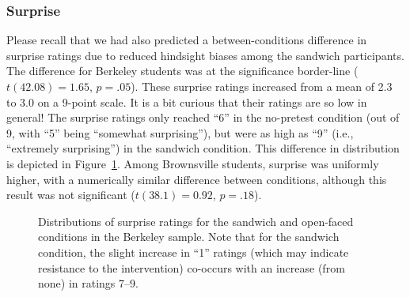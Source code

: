 \subsubsection{Surprise}

Please recall that we had also predicted a between-conditions difference in
surprise ratings due to reduced hindsight biases among the sandwich
participants. The difference for Berkeley students was at the significance
border-line ($t(42.08) = 1.65$, $p = .05$). These surprise ratings increased
from a mean of 2.3 to 3.0 on a 9-point scale. It is a bit curious that
their ratings are so low in general! The surprise ratings only reached “6” in
the no-pretest condition (out of 9, with “5” being “somewhat surprising”), but
were as high as “9” (i.e., “extremely surprising”) in the sandwich condition.
This difference in distribution is depicted in
Figure~\ref{fig:uc-mech-surprise}.  Among Brownsville students, surprise was
uniformly higher, with a numerically similar difference between conditions,
although this result was not significant ($t(38.1) = 0.92$, $p = .18$). 

\begin{figure}[h]
    \centering
    \caption{Distributions of surprise ratings for the sandwich and open-faced
        conditions in the Berkeley sample. Note that for the sandwich condition,
        the slight increase in ``1'' ratings (which may indicate resistance to
        the intervention) co-occurs with an increase (from none) in ratings 7--9.}
    \label{fig:uc-mech-surprise}
\end{figure}

